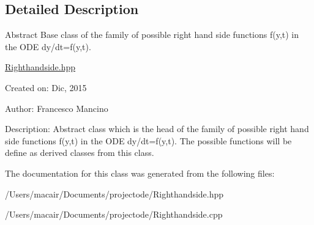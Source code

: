 \subsection{Detailed Description}
Abstract Base class of the family of possible right hand side functions f(y,t) in the O\+D\+E dy/dt=f(y,t). 

\hyperlink{_righthandside_8hpp_source}{Righthandside.\+hpp}

Created on\+: Dic, 2015 \begin{DoxyVerb}Author: Francesco Mancino
\end{DoxyVerb}


Description\+: Abstract class which is the head of the family of possible right hand side functions f(y,t) in the O\+D\+E dy/dt=f(y,t). The possible functions will be define as derived classes from this class. 

The documentation for this class was generated from the following files\+:\begin{DoxyCompactItemize}
\item 
/\+Users/macair/\+Documents/projectode/Righthandside.\+hpp\item 
/\+Users/macair/\+Documents/projectode/Righthandside.\+cpp\end{DoxyCompactItemize}
